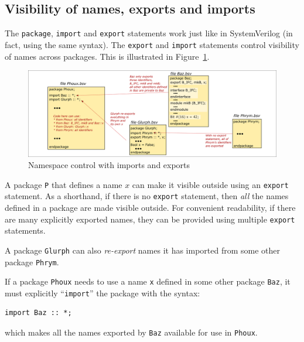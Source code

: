 \subsection{Visibility of names, exports and imports}

The \verb|package|, \verb|import| and \verb|export| statements work
just like in SystemVerilog (in fact, using the same syntax).  The
\verb|export| and \verb|import| statements control visibility of names
across packages.  This is illustrated in Figure~\ref{Fig_BSV_namespace_control}.
\begin{figure}[htbp]
  \centerline{\includegraphics[width=6in,angle=0]{Figures/Fig_BSV_namespace_control}}
  \caption{\label{Fig_BSV_namespace_control}
           Namespace control with imports and exports}
\end{figure}


A package \verb|P| that defines a name $x$ can make it visible outside
using an \verb|export| statement.  As a shorthand, if there is no
\verb|export| statement, then \emph{all} the names defined in a
package are made visible outside.  For convenient readability, if
there are many explicitly exported names, they can be provided using
multiple \verb|export| statements.

A package \verb|Glurph| can also \emph{re-export} names it has
imported from some other package \verb|Phrym|.

If a package \verb|Phoux| needs to use a name \verb|x| defined in some
other package \verb|Baz|, it must explicitly ``\verb|import|'' the
package with the syntax:

{\small
\begin{Verbatim}[frame=single]
import Baz :: *;
\end{Verbatim}
}

which makes all the names exported by \verb|Baz| available for use in
\verb|Phoux|.

\vspace{2ex}

